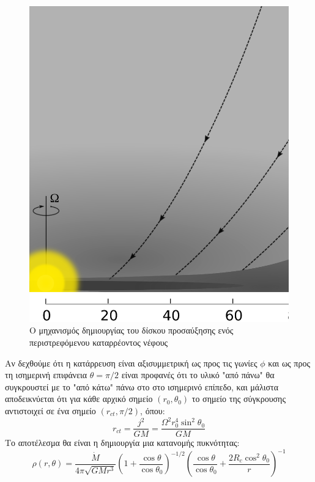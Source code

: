 \documentclass[a4paper,12pt]{memoir}
\def\medpage{13cm}
\begin{document}
\begin{figure}[h!]
	\centering
	\includegraphics[width=\medpage]{images/disk2.ps}
	\caption{Ο μηχανισμός δημιουργίας του δίσκου προσαύξησης ενός περιστρεφόμενου καταρρέοντος νέφους}
\end{figure}


Αν δεχθούμε ότι η κατάρρευση είναι αξισυμμετρική ως προς τις γωνίες $\phi$ και ως προς τη ισημερινή επιφάνεια $\theta = \pi/2$ είναι προφανές ότι το υλικό "από πάνω" θα συγκρουστεί με το "από κάτω" πάνω στο στο ισημερινό επίπεδο, και μάλιστα αποδεικνύεται ότι για κάθε αρχικό σημείο $(r_0,\theta _0)$ το σημείο της σύγκρουσης αντιστοιχεί σε ένα σημείο $(r_{ct},\pi/2)$, όπου:
\begin{equation}
r_{ct}=\frac{j^2}{GM}=\frac{\Omega^2 r_0 ^4 \sin ^2 \theta_0}{GM}
\end{equation}
Το αποτέλεσμα θα είναι η δημιουργία μια κατανομής πυκνότητας:
\begin{equation}
\rho (r,\theta) =\frac{\dot{M}}{4 \pi \sqrt{G M r^3}}\left(1+\frac{\cos \theta}{\cos \theta _0}\right)^{-1/2} \left( \frac{\cos \theta}{\cos \theta _0} + \frac{2 R_c \cos^2 \theta _0}{r} \right) ^{-1} 
\end{equation}
\end{document}
